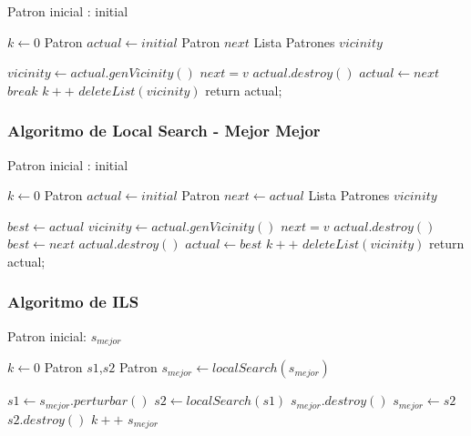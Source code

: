 \documentclass[letterpaper,11pt]{article}
\begin{document}
\begin{algorithmic}

\REQUIRE Patron inicial : initial

\STATE $k \gets 0$
\STATE  Patron $actual \gets initial$
\STATE  Patron $next$
\STATE  Lista Patrones $vicinity$

	\STATE $ vicinity \gets actual.genVicinity() $
		\STATE $next = v$
        	\STATE $actual.destroy() $
        	\STATE $ actual \gets next$
        	\STATE $break$
        \ENDIF
    \ENDWHILE
    \STATE $k++$
    \STATE $deleteList(vicinity)$
\ENDWHILE
\RETURN  return actual;

\end{algorithmic}

\subsubsection{Algoritmo de Local Search - Mejor Mejor}

\begin{algorithmic}

\REQUIRE Patron inicial : initial

\STATE $k \gets 0$
\STATE  Patron $actual \gets initial$
\STATE  Patron $next \gets actual$
\STATE  Lista Patrones $vicinity$

	
	\STATE $ best \gets actual $
	\STATE $ vicinity \gets actual.genVicinity() $
		\STATE $next = v$
        	\STATE $actual.destroy() $
        	\STATE $ best \gets next$
        \ENDIF
    \ENDWHILE
       	\STATE $actual.destroy() $
       	\STATE $ actual \gets best$
	\ENDIF
    \STATE $k++$
    \STATE $deleteList(vicinity)$
\ENDWHILE
\RETURN  return actual;

\end{algorithmic}

\subsubsection{Algoritmo de ILS}

\begin{center}
\begin{algorithmic}

\REQUIRE Patron inicial: $s_{mejor}$

\STATE $k \gets 0$
\STATE Patron $s1$,$s2$
\STATE Patron $s_{mejor} \gets localSearch(s_{mejor})$

    \STATE $ s1 \gets s_{mejor}.perturbar() $
    \STATE $ s2 \gets localSearch(s1) $
    	\STATE $ s_{mejor}.destroy() $
        \STATE $ s_{mejor} \gets s2 $
    \ENDIF
    \STATE $ s2.destroy() $
    \STATE $k++$
\ENDWHILE
\RETURN $s_{mejor}$

\end{algorithmic}
\end{center}
\end{document}
